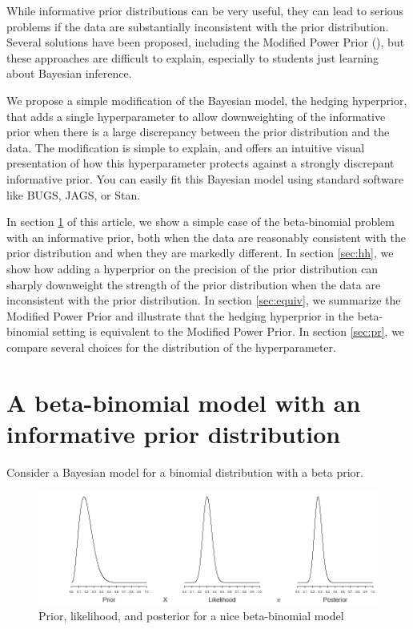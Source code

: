 \documentclass[12pt]{article}
\begin{document}
While informative prior distributions can be very useful, they can lead to serious problems if the data are substantially inconsistent with the prior distribution. Several solutions have been proposed, including the Modified Power Prior (\cite{ibrahim03}), but these approaches are difficult to explain, especially to students just learning about Bayesian inference.

We propose a simple modification of the Bayesian model, the hedging hyperprior, that adds a single hyperparameter to allow downweighting of the informative prior when there is a large discrepancy between the prior distribution and the data. The modification is simple to explain, and offers an intuitive visual presentation of how this hyperparameter protects against a strongly discrepant informative prior. You can easily fit this Bayesian model using standard software like BUGS, JAGS, or Stan.

In section \ref{sec:bb} of this article, we show a simple case of the beta-binomial problem with an informative prior, both when the data are reasonably consistent with the prior distribution and when they are markedly different. In section \ref{sec:hh}, we show how adding a hyperprior on the precision of the prior distribution can sharply downweight the strength of the prior distribution when the data are inconsistent with the prior distribution. In section \ref{sec:equiv}, we summarize the Modified Power Prior and illustrate that the hedging hyperprior in the beta-binomial setting is equivalent to the Modified Power Prior. In section \ref{sec:pr}, we compare several choices for the distribution of the hyperparameter.

\section{A beta-binomial model with an informative prior distribution}
\label{sec:bb}
Consider a Bayesian model for a binomial distribution with a beta prior. 

\begin{figure}
\begin{center}
\includegraphics[width=6in]{fig1.png}
\end{center}
\caption{Prior, likelihood, and posterior for a nice beta-binomial model \label{fig:fig_nice}}
\end{figure}
\end{document}
